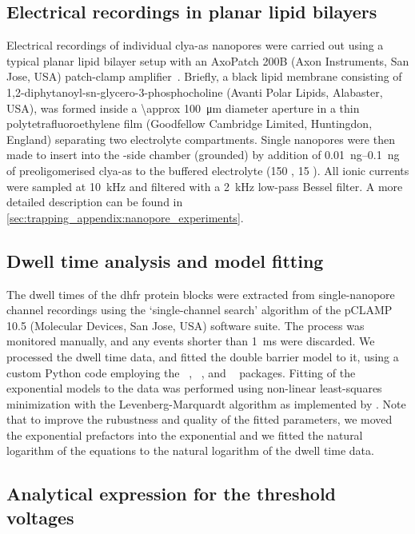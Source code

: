 \subsection{Electrical recordings in planar lipid bilayers}
%

Electrical recordings of individual \gls{clya-as} nanopores were carried out using a typical planar lipid
bilayer setup with an AxoPatch 200B (Axon Instruments, San Jose, USA) patch-clamp
amplifier~\cite{Maglia-2010,Soskine-2012}. Briefly, a black lipid membrane consisting of
1,2-diphytanoyl-sn-glycero-3-phosphocholine (Avanti Polar Lipids, Alabaster, USA), was formed inside a
\SI{\approx 100}{\micro\meter} diameter aperture in a thin polytetrafluoroethylene film (Goodfellow Cambridge
Limited, Huntingdon, England) separating two electrolyte compartments. Single nanopores were then made to
insert into the \cisi{}-side chamber (grounded) by addition of \SIrange{0.01}{0.1}{\nano\gram} of
preoligomerised \gls{clya-as} to the buffered electrolyte (\SI{150}{\mM} , \SI{15}{\mM} 
). All ionic currents were sampled at \SI{10}{\kilo\hertz} and filtered with a \SI{2}{\kilo\hertz}
low-pass Bessel filter. A more detailed description can be found in
\cref{sec:trapping_appendix:nanopore_experiments}.


\subsection{Dwell time analysis and model fitting}
%

The dwell times of the \gls{dhfr} protein blocks were extracted from single-nanopore channel recordings using
the `single-channel search' algorithm of the pCLAMP 10.5 (Molecular Devices, San Jose, USA) software suite.
The process was monitored manually, and any events shorter than \SI{1}{\ms} were discarded. We processed the
dwell time data, and fitted the double barrier model to it, using a custom Python code employing the
~\cite{vanderWalt-2011}, ~\cite{McKinney-2010}, and ~\cite{Newville-2014}
packages. Fitting of the exponential models to the data was performed using non-linear least-squares
minimization with the Levenberg-Marquardt algorithm as implemented by . Note that to improve the
rubustness and quality of the fitted parameters, we moved the exponential prefactors into the exponential and
we fitted the natural logarithm of the equations to the natural logarithm of the dwell time data.

\subsection{Analytical expression for the threshold voltages}
%

